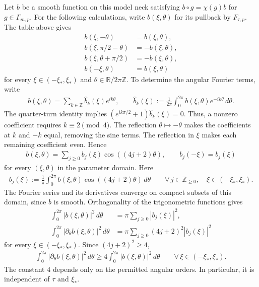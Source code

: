 \documentclass[a4paper,11pt,oneside,reqno]{amsart}
\numberwithin{equation}{section}
\theoremstyle{definition}
\begin{document}
Let $b$ be a smooth function on this model neck
satisfying $b\circ g=\chi(g)b$ for $g\in\Gamma_{m,p}$.
For the following calculations, write $b(\xi,\theta)$
for its pullback by $F_{\tau,p}$. The table above gives
%
\begin{align*}
    b(\xi,-\theta)&=b(\xi,\theta),\\
    b(\xi,\pi/2-\theta)&=-b(\xi,\theta),\\
    b(\xi,\theta+\pi/2)&=-b(\xi,\theta),\\
    b(-\xi,\theta)&=b(\xi,\theta)
\end{align*}
%
for every $\xi\in(-\xi_*,\xi_*)$ and
$\theta\in\mathbb R/2\pi\mathbb Z$.
To determine the angular Fourier terms, write
%
\begin{align*}
    b(\xi,\theta)=\sum_{k\in\mathbb Z}
    \widehat b_k(\xi)e^{ik\theta},
    \qquad
    \widehat b_k(\xi):=
    \frac1{2\pi}\int_0^{2\pi}
    b(\xi,\theta)e^{-ik\theta}\,d\theta.
\end{align*}
%
The quarter-turn identity implies
$(e^{ik\pi/2}+1)\widehat b_k(\xi)=0$.
Thus, a nonzero coefficient requires $k\equiv2\pmod4$.
The reflection $\theta\mapsto-\theta$ makes the
coefficients at $k$ and $-k$ equal, removing the sine
terms. The reflection in $\xi$ makes each remaining
coefficient even. Hence
%
\begin{align}
    \label{eq:s4-neck-modes}
    b(\xi,\theta)=
    \sum_{j\geq0}b_j(\xi)\cos((4j+2)\theta),
    \qquad
    b_j(-\xi)=b_j(\xi)
\end{align}
%
for every $(\xi,\theta)$ in the parameter domain.
Here
%
\begin{align*}
    b_j(\xi):=\frac1\pi\int_0^{2\pi}
    b(\xi,\theta)\cos((4j+2)\theta)\,d\theta
    \qquad\forall\,j\in\mathbb Z_{\geq0},\quad
    \xi\in(-\xi_*,\xi_*).
\end{align*}
%
The Fourier series and its derivatives converge on
compact subsets of this domain, since $b$ is smooth.
Orthogonality of the trigonometric functions gives
%
\begin{align*}
    \int_0^{2\pi}|b(\xi,\theta)|^2\,d\theta
    &=\pi\sum_{j\geq0}|b_j(\xi)|^2,\\
    \int_0^{2\pi}|\partial_\theta b(\xi,\theta)|^2\,d\theta
    &=\pi\sum_{j\geq0}(4j+2)^2|b_j(\xi)|^2
\end{align*}
%
for every $\xi\in(-\xi_*,\xi_*)$. Since $(4j+2)^2\geq4$,
%
\begin{align}
    \label{eq:s4-symmetry-angular-poincare}
    \int_0^{2\pi}|\partial_\theta b(\xi,\theta)|^2\,d\theta
    \geq
    4\int_0^{2\pi}|b(\xi,\theta)|^2\,d\theta
    \qquad\forall\,\xi\in(-\xi_*,\xi_*).
\end{align}
%
The constant $4$ depends only on the permitted angular
orders. In particular, it is independent of $\tau$
and $\xi_*$.
\end{document}
